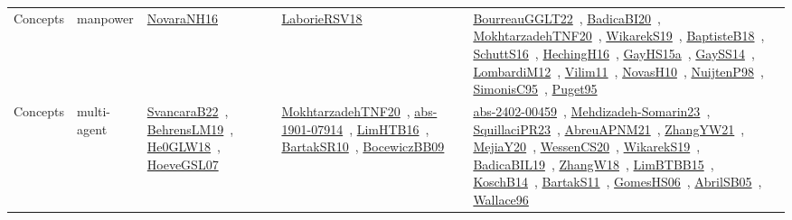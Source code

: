 {\begin{longtable}{lp{3cm}>{\raggedright\arraybackslash}p{6cm}>{\raggedright\arraybackslash}p{6cm}>{\raggedright\arraybackslash}p{8cm}}
Concepts & manpower & \href{works/NovaraNH16.pdf}{NovaraNH16}~\cite{NovaraNH16} & \href{works/LaborieRSV18.pdf}{LaborieRSV18}~\cite{LaborieRSV18} & \href{works/BourreauGGLT22.pdf}{BourreauGGLT22}~\cite{BourreauGGLT22}, \href{works/BadicaBI20.pdf}{BadicaBI20}~\cite{BadicaBI20}, \href{works/MokhtarzadehTNF20.pdf}{MokhtarzadehTNF20}~\cite{MokhtarzadehTNF20}, \href{works/WikarekS19.pdf}{WikarekS19}~\cite{WikarekS19}, \href{works/BaptisteB18.pdf}{BaptisteB18}~\cite{BaptisteB18}, \href{works/SchuttS16.pdf}{SchuttS16}~\cite{SchuttS16}, \href{works/HechingH16.pdf}{HechingH16}~\cite{HechingH16}, \href{works/GayHS15a.pdf}{GayHS15a}~\cite{GayHS15a}, \href{works/GaySS14.pdf}{GaySS14}~\cite{GaySS14}, \href{works/LombardiM12.pdf}{LombardiM12}~\cite{LombardiM12}, \href{works/Vilim11.pdf}{Vilim11}~\cite{Vilim11}, \href{works/NovasH10.pdf}{NovasH10}~\cite{NovasH10}, \href{works/NuijtenP98.pdf}{NuijtenP98}~\cite{NuijtenP98}, \href{works/SimonisC95.pdf}{SimonisC95}~\cite{SimonisC95}, \href{works/Puget95.pdf}{Puget95}~\cite{Puget95}\\
Concepts & multi-agent & \href{works/SvancaraB22.pdf}{SvancaraB22}~\cite{SvancaraB22}, \href{works/BehrensLM19.pdf}{BehrensLM19}~\cite{BehrensLM19}, \href{works/He0GLW18.pdf}{He0GLW18}~\cite{He0GLW18}, \href{works/HoeveGSL07.pdf}{HoeveGSL07}~\cite{HoeveGSL07} & \href{works/MokhtarzadehTNF20.pdf}{MokhtarzadehTNF20}~\cite{MokhtarzadehTNF20}, \href{works/abs-1901-07914.pdf}{abs-1901-07914}~\cite{abs-1901-07914}, \href{works/LimHTB16.pdf}{LimHTB16}~\cite{LimHTB16}, \href{works/BartakSR10.pdf}{BartakSR10}~\cite{BartakSR10}, \href{works/BocewiczBB09.pdf}{BocewiczBB09}~\cite{BocewiczBB09} & \href{works/abs-2402-00459.pdf}{abs-2402-00459}~\cite{abs-2402-00459}, \href{works/Mehdizadeh-Somarin23.pdf}{Mehdizadeh-Somarin23}~\cite{Mehdizadeh-Somarin23}, \href{works/SquillaciPR23.pdf}{SquillaciPR23}~\cite{SquillaciPR23}, \href{works/AbreuAPNM21.pdf}{AbreuAPNM21}~\cite{AbreuAPNM21}, \href{works/ZhangYW21.pdf}{ZhangYW21}~\cite{ZhangYW21}, \href{works/MejiaY20.pdf}{MejiaY20}~\cite{MejiaY20}, \href{works/WessenCS20.pdf}{WessenCS20}~\cite{WessenCS20}, \href{works/WikarekS19.pdf}{WikarekS19}~\cite{WikarekS19}, \href{works/BadicaBIL19.pdf}{BadicaBIL19}~\cite{BadicaBIL19}, \href{works/ZhangW18.pdf}{ZhangW18}~\cite{ZhangW18}, \href{works/LimBTBB15.pdf}{LimBTBB15}~\cite{LimBTBB15}, \href{works/KoschB14.pdf}{KoschB14}~\cite{KoschB14}, \href{works/BartakS11.pdf}{BartakS11}~\cite{BartakS11}, \href{works/GomesHS06.pdf}{GomesHS06}~\cite{GomesHS06}, \href{works/AbrilSB05.pdf}{AbrilSB05}~\cite{AbrilSB05}, \href{works/Wallace96.pdf}{Wallace96}~\cite{Wallace96}\\

\end{longtable}}
